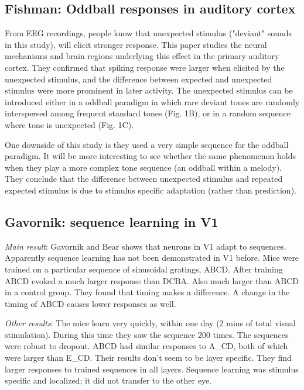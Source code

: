 \documentclass{article} %
\begin{document}
\subsection{Fishman: Oddball responses in auditory cortex}
 
From EEG recordings, people know that unexpected stimulus ("deviant" sounds in
this study), will elicit stronger response. This paper \cite{Fishman2012}
studies the neural mechanisms and brain regions underlying this effect in the
primary auditory cortex. They confirmed that spiking response were larger when
elicited by the unexpected stimulus, and the difference between expected and
unexpected stimulus were more prominent in later activity. The unexpected
stimulus can be introduced either in a oddball paradigm in which rare deviant
tones are randomly interspersed among frequent standard tones (Fig. 1B), or in
a random sequence where tone is unexpected (Fig. 1C).

One downside of this study is they used a very simple sequence for the oddball
paradigm. It will be more interesting to see whether the same phenomenon holds
when they play a more complex tone sequence (an oddball within a melody). They
conclude that the difference between unexpected stimulus and repeated expected
stimulus is due to stimulus specific adaptation (rather than prediction).

\subsection{Gavornik: sequence learning in V1}

\emph{Main result}: Gavornik and Bear \cite{Gavornik2014} shows that neurons in
V1 adapt to sequences. Apparently sequence learning has not been demonstrated in
V1 before. Mice were trained on a particular sequence of sinusoidal gratings,
ABCD.  After training ABCD evoked a much larger response than DCBA. Also much
larger than ABCD in a control group.  They found that timing makes a difference.
A change in the timing of ABCD causes lower responses as well.

\emph{Other results}: The mice learn very quickly, within one day (2 mins of
total
visual stimulation). During this time they saw the sequence 200 times.  The
sequences were robust to dropout. ABCD had similar responses to A\_CD, both of
which were larger than E\_CD.  Their results don't seem to be layer specific.
They find larger responses to trained sequences in all layers.   Sequence
learning was stimulus specific and localized; it did not transfer to the other
eye.
\end{document}
